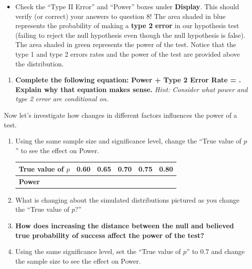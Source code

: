 \documentclass[
]{report}
\providecommand{\tightlist}{%
  \setlength{\itemsep}{0pt}\setlength{\parskip}{0pt}}
\begin{document}
\begin{itemize}
\tightlist
\item
  Check the ``Type II Error'' and ``Power'' boxes under \textbf{Display}. This should verify (or correct) your answers to question 8! The area shaded in blue represents the probability of making a \textbf{type 2 error} in our hypothesis test (failing to reject the null hypothesis even though the null hypothesis is false). The area shaded in green represents the power of the test. Notice that the type 1 and type 2 errors rates and the power of the test are provided above the distribution.
\end{itemize}

\begin{enumerate}
\def\labelenumi{\arabic{enumi}.}
\setcounter{enumi}{8}
\tightlist
\item
  \textbf{Complete the following equation: Power + Type 2 Error Rate = . Explain why that equation makes sense.} \emph{Hint: Consider what power and type 2 error are conditional on.}
  \vspace{0.8in}
\end{enumerate}

Now let's investigate how changes in different factors influences the power of a test.

\begin{enumerate}
\def\labelenumi{\arabic{enumi}.}
\setcounter{enumi}{9}
\item
  Using the same sample size and significance level, change the ``True value of \(p\)'' to see the effect on Power.
  \setlength\tabcolsep{0.5cm}

  \begin{longtable}{|l|c|c|c|c|c|}
  \hline
  \textbf{True value of $p$}& 0.60 & 0.65 & 0.70 & 0.75 & 0.80 \\ \hline
  \textbf{Power} & & & & &  \\ \hline
  \end{longtable}
\item
  What is changing about the simulated distributions pictured as you change the ``True value of \(p\)?''
  \vspace{0.5in}
\item
  \textbf{How does increasing the distance between the null and believed true probability of success affect the power of the test?}
  \vspace{0.5in}
\item
  Using the same significance level, set the ``True value of \(p\)'' to 0.7 and change the sample size to see the effect on Power.
\end{enumerate}
\end{document}
